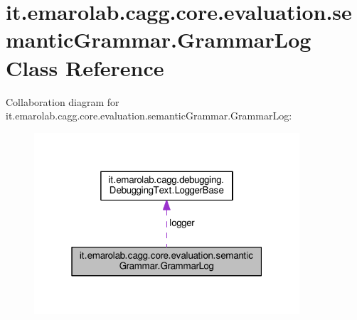 \hypertarget{classit_1_1emarolab_1_1cagg_1_1core_1_1evaluation_1_1semanticGrammar_1_1GrammarLog}{\section{it.\-emarolab.\-cagg.\-core.\-evaluation.\-semantic\-Grammar.\-Grammar\-Log Class Reference}
\label{classit_1_1emarolab_1_1cagg_1_1core_1_1evaluation_1_1semanticGrammar_1_1GrammarLog}
}


Collaboration diagram for it.\-emarolab.\-cagg.\-core.\-evaluation.\-semantic\-Grammar.\-Grammar\-Log\-:\nopagebreak
\begin{figure}[H]
\begin{center}
\leavevmode
\includegraphics[width=280pt]{classit_1_1emarolab_1_1cagg_1_1core_1_1evaluation_1_1semanticGrammar_1_1GrammarLog__coll__graph}
\end{center}
\end{figure}
